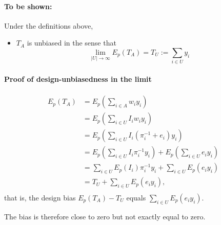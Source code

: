 \documentclass{article}
\begin{document}
\paragraph{To be shown:}

Under the definitions above,
\begin{itemize}
	\item[] $T_A$ is unbiased in the sense that $$\lim_{|U| \rightarrow \infty} E_p(T_A) = T_U := \sum_{i \in U} y_i$$
\end{itemize}

\paragraph{Proof of design-unbiasedness in the limit}

\begin{equation}\begin{split}
	E_p(T_A) &= E_p\left(\sum_{i \in A} w_i y_i\right) \\
		&= E_p\left(\sum_{i \in U} I_i w_i y_i\right) \\
		&=	E_p\left(\sum_{i \in U} I_i (\pi_i^{-1} + e_i) y_i\right) \\
		&=	E_p\left(\sum_{i \in U} I_i \pi_i^{-1} y_i\right) + E_p\left(\sum_{i \in U} e_i y_i\right) \\
		&=	\sum_{i \in U} E_p(I_i) \pi_i^{-1} y_i + \sum_{i \in U} E_p \left(e_i y_i\right) \\
		&=	T_U + \sum_{i \in U} E_p \left(e_i y_i\right), \\
\end{split}\end{equation}
that is, the design bias $E_p(T_A) - T_U$  equals $\sum_{i \in U} E_p \left(e_i y_i\right)$. 

The bias is therefore close to zero but not exactly equal to zero.
\end{document}
